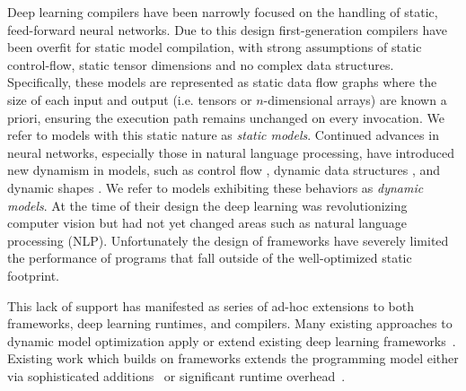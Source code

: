 Deep learning compilers have been narrowly focused
  on the handling of static, feed-forward neural networks.
Due to this design first-generation compilers have been overfit
  for static model compilation, with strong assumptions of static control-flow,
  static tensor dimensions and no complex data structures.
Specifically, these models are represented as static data flow graphs where the
  size of each input and output (i.e. tensors or $n$-dimensional arrays) are known a priori,
  ensuring the execution path remains unchanged on every invocation.
We refer to models with this static nature as \emph{static models}.
Continued advances in neural networks, especially those in natural language processing,
  have introduced new dynamism in models, such as control flow \citep{lstm, language_model},
  dynamic data structures \citep{tree_lstm, graph_lstm}, and dynamic shapes \citep{devlin2018bert}.
  We refer to models exhibiting these behaviors as {\em dynamic models}.
At the time of their design the deep learning was revolutionizing
  computer vision but had not yet changed areas such as natural language processing (NLP).
Unfortunately the design of frameworks have severely limited the performance
  of programs that fall outside of the well-optimized static footprint.

This lack of support has manifested as series of ad-hoc extensions to
  both frameworks, deep learning runtimes, and compilers.
Many existing approaches to dynamic model optimization apply or
  extend existing deep learning frameworks~\citep{xu2018cavs, gao2018low, yu2018dynamic, jeong2018improving, jeong2019janus, dynet, tf_fold}.
Existing work which builds on frameworks extends the programming model either via
  sophisticated additions~\citep{yu2018dynamic} or significant runtime overhead~\citep{tf_fold, jeong2019janus}.


